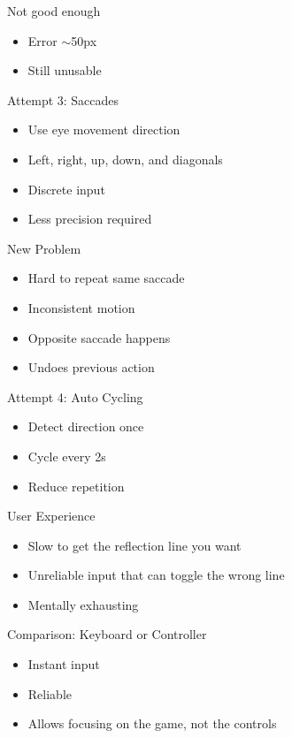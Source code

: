 \documentclass{beamer}
\begin{document}
\begin{frame}{Not good enough}
\begin{itemize}
    \item Error $\sim$50px
    \item Still unusable
\end{itemize}
\end{frame}

\begin{frame}{Attempt 3: Saccades}
\begin{itemize}
    \item Use eye movement direction
    \item Left, right, up, down, and diagonals
    \item Discrete input
    \item Less precision required
\end{itemize}
\end{frame}

\begin{frame}{New Problem}
\begin{itemize}
    \item Hard to repeat same saccade
    \item Inconsistent motion
    \item Opposite saccade happens
    \item Undoes previous action
\end{itemize}
\end{frame}

\begin{frame}{Attempt 4: Auto Cycling}
\begin{itemize}
    \item Detect direction once
    \item Cycle every 2s
    \item Reduce repetition
\end{itemize}
\end{frame}

\begin{frame}{User Experience}
\begin{itemize}
    \item Slow to get the reflection line you want
    \item Unreliable input that can toggle the wrong line
    \item Mentally exhausting
\end{itemize}
\end{frame}

\begin{frame}{Comparison: Keyboard or Controller}
\begin{itemize}
    \item Instant input
    \item Reliable
    \item Allows focusing on the game, not the controls
\end{itemize}
\end{frame}
\end{document}
